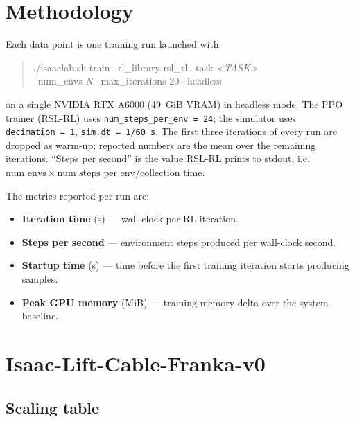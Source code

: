 \documentclass[11pt,a4paper]{article}
\begin{document}
\section{Methodology}

Each data point is one training run launched with
\begin{quote}\ttfamily\small
./isaaclab.sh train --rl\_library rsl\_rl --task \textit{\textless TASK\textgreater}\\
\hphantom{./isaaclab.sh train }--num\_envs \textit{N} --max\_iterations 20 --headless
\end{quote}
on a single NVIDIA RTX A6000 (49~GiB VRAM) in headless mode. The PPO trainer
(RSL-RL) uses \texttt{num\_steps\_per\_env~=~24}; the simulator uses
\texttt{decimation~=~1}, \texttt{sim.dt~=~1/60\,s}. The first three
iterations of every run are dropped as warm-up; reported numbers are the
mean over the remaining iterations. ``Steps per second'' is the value
RSL-RL prints to stdout, i.e.
$\text{num\_envs}\times\text{num\_steps\_per\_env}/\text{collection\_time}$.

\medskip
The metrics reported per run are:
\begin{itemize}\setlength\itemsep{0pt}
  \item \textbf{Iteration time} (s) --- wall-clock per RL iteration.
  \item \textbf{Steps per second} --- environment steps produced per
    wall-clock second.
  \item \textbf{Startup time} (s) --- time before the first training
    iteration starts producing samples.
  \item \textbf{Peak GPU memory} (MiB) --- training memory delta over
    the system baseline.
\end{itemize}

\section{Isaac-Lift-Cable-Franka-v0}

\subsection{Scaling table}
\end{document}
